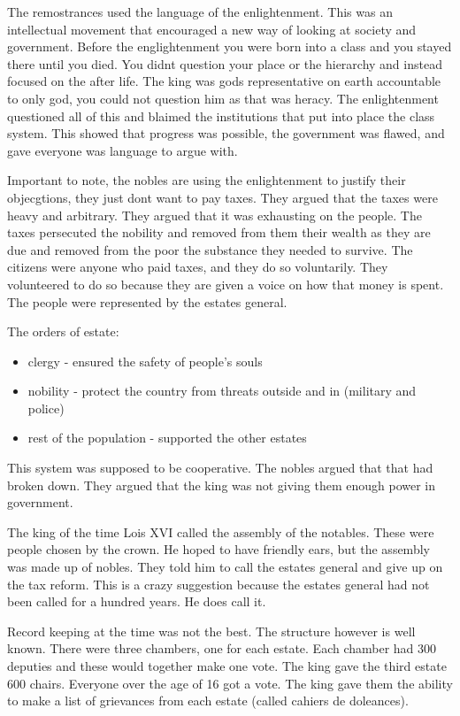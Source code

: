 \documentclass{article}
\begin{document}
The remostrances used the language of the enlightenment. This was an intellectual movement that encouraged a new way of looking at society and government. Before the englightenment you were born into a class and you stayed there until you died. You didnt question your place or the hierarchy and instead focused on the after life. The king was gods representative on earth accountable to only god, you could not question him as that was heracy. The enlightenment questioned all of this and blaimed the institutions that put into place the class system. This showed that progress was possible, the government was flawed, and gave everyone was language to argue with.

Important to note, the nobles are using the enlightenment to justify their objecgtions, they just dont want to pay taxes. They argued that the taxes were heavy and arbitrary. They argued that it was exhausting on the people. The taxes persecuted the nobility and removed from them their wealth as they are due and removed from the poor the substance they needed to survive. The citizens were anyone who paid taxes, and they do so voluntarily. They volunteered to do so because they are given a voice on how that money is spent. The people were represented by the estates general.

The orders of estate:
\begin{itemize}
	\item clergy - ensured the safety of people's souls
	\item nobility - protect the country from threats outside and in (military and police)
	\item rest of the population - supported the other estates
\end{itemize}

This system was supposed to be cooperative. The nobles argued that that had broken down. They argued that the king was not giving them enough power in government.

The king of the time Lois XVI called the assembly of the notables. These were people chosen by the crown. He hoped to have friendly ears, but the assembly was made up of nobles. They told him to call the estates general and give up on the tax reform. This is a crazy suggestion because the estates general had not been called for a hundred years. He does call it.

Record keeping at the time was not the best. The structure however is well known. There were three chambers, one for each estate. Each chamber had 300 deputies and these would together make one vote. The king gave the third estate 600 chairs. Everyone over the age of 16 got a vote. The king gave them the ability to make a list of grievances from each estate (called cahiers de doleances).
\end{document}
